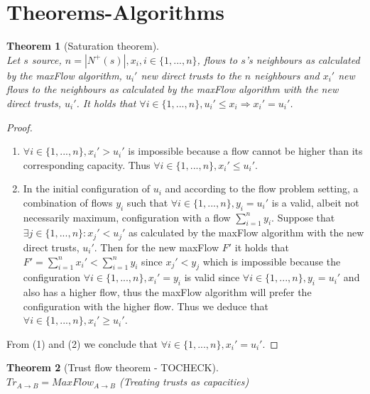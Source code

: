 \documentclass[11pt]{article}
\newtheorem{theorem}{Theorem}[section]
\theoremstyle{definition}
\theoremstyle{corollary}
\begin{document}
  \section{Theorems-Algorithms}
    \begin{theorem}[Saturation theorem] \ \\ 
    \label{saturation}
       Let $s$ source, $n = |N^{+}(s)|, x_i, i \in \{1,...,n\}$, flows to $s$'s neighbours as calculated by the
       maxFlow algorithm, $u_i'$ new direct trusts to the $n$ neighbours and $x_i'$ new flows to the neighbours
       as calculated by the maxFlow algorithm with the new direct trusts, $u_i'$. It holds that
       $\forall i \in \{1,...,n\}, u_i' \leq x_i \Rightarrow x_i' = u_i'$.
    \end{theorem}
    \begin{proof} \ 
       \begin{enumerate}
          \item $\forall i \in \{1,...,n\}, x_i' > u_i'$ is impossible because a flow cannot be higher than its
                corresponding capacity. Thus $\forall i \in \{1,...,n\}, x_i' \leq u_i'$.
          \item In the initial configuration of $u_i$ and according to the flow problem setting, a combination of flows
                $y_i$ such that $\forall i \in \{1,...,n\}, y_i = u_i'$ is a valid, albeit not necessarily maximum,
                configuration with a flow $\sum\limits_{i=1}^{n}y_i$. Suppose that $\exists j \in \{1,...,n\} : x_j'
                < u_j'$ as calculated by the maxFlow algorithm with the new direct trusts, $u_i'$. Then for the new
                maxFlow $F'$ it holds that $F' = \sum\limits_{i=1}^{n}x_i' < \sum\limits_{i=1}^{n}y_i$ since $x_j' < y_j$
                which is impossible because the configuration $\forall i \in \{1,...,n\}, x_i' = y_i$ is valid since
                $\forall i \in \{1,...,n\}, y_i = u_i'$ and also has a higher flow, thus the maxFlow algorithm will
                prefer the configuration with the higher flow. Thus we deduce that $\forall i \in \{1,...,n\},
                x_i' \geq u_i'$.
       \end{enumerate}
       From (1) and (2) we conclude that $\forall i \in \{1,...,n\}, x_i' = u_i'$.
    \end{proof}
    \begin{theorem}[Trust flow theorem - TOCHECK] \ \\
    \label{trustflow}
       $Tr_{A \rightarrow B} = MaxFlow_{A \rightarrow B}$ (Treating trusts as capacities)
    \end{theorem}
\end{document}
